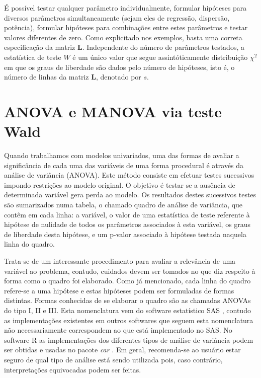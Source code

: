 É possível testar qualquer parâmetro individualmente, formular hipóteses para diversos parâmetros simultaneamente (sejam eles de regressão, dispersão, potência), formular hipóteses para combinações entre estes parâmetros e testar valores diferentes de zero. Como explicitado nos exemplos, basta uma correta especificação da matriz $\boldsymbol{L}$. Independente do número de parâmetros testados, a estatística de teste $W$ é um único valor que segue assintóticamente distribuição $\chi^2$ em que os graus de liberdade são dados pelo número de hipóteses, isto é, o número de linhas da matriz $\boldsymbol{L}$, denotado por $s$.

\section{ANOVA e MANOVA via teste Wald}

Quando trabalhamos com modelos univariados, uma das formas de avaliar a significância de cada uma das variáveis de uma forma procedural é através da análise de variância (ANOVA). Este método consiste em efetuar testes sucessivos impondo restrições ao modelo original. O objetivo é testar se a ausência de determinada variável gera perda ao modelo. Os resultados destes sucessivos testes são sumarizados numa tabela, o chamado quadro de análise de variância, que contêm em cada linha: a variável, o valor de uma estatística de teste referente à hipótese de nulidade de todos os parâmetros associados à esta variável, os graus de liberdade desta hipótese, e um p-valor associado à hipótese testada naquela linha do quadro.

Trata-se de um interessante procedimento para avaliar a relevância de uma variável ao problema, contudo, cuidados devem ser tomados no que diz respeito à forma como o quadro foi elaborado. Como já mencionado, cada linha do quadro refere-se a uma hipótese e estas hipóteses podem ser formuladas de formas distintas. Formas conhecidas de se elaborar o quadro são as chamadas ANOVAs do tipo I, II e III. Esta nomenclatura vem do software estatístico SAS \citep{sas}, contudo  as implementações existentes em outros softwares que seguem esta nomenclatura não necessariamente correspondem ao que está implementado no SAS. No software R \citep{softwareR} as implementações dos diferentes tipos de análise de variância podem ser obtidas e usadas no pacote \emph{car} \citep{car}. Em geral, recomenda-se ao usuário estar seguro de qual tipo de análise está sendo utilizada pois, caso contrário, interpretações equivocadas podem ser feitas.

